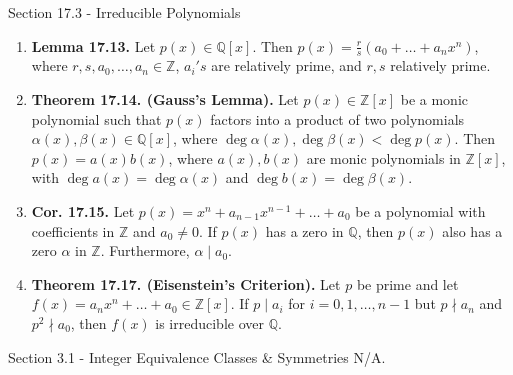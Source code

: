 \documentclass[12pt]{article}
\theoremstyle{definition}
\theoremstyle{named}
\begin{document}
\begin{section}{Section 17.3 - Irreducible Polynomials}
    \begin{enumerate}
        \item \textbf{Lemma 17.13. } Let $p(x) \in \mathbb{Q}[x]$. Then $p(x) = \frac{r}{s}(a_0 + \dots + a_nx^n)$, where $r,s,a_0,\dots,a_n \in \mathbb{Z}$, $a_i's$ are relatively prime, and $r,s$ relatively prime. 
        \item \textbf{Theorem 17.14. (Gauss's Lemma). } Let $p(x) \in \mathbb{Z}[x]$ be a monic polynomial such that $p(x)$ factors into a product of two polynomials $\alpha(x),\beta(x) \in \mathbb{Q}[x]$, where $\deg\alpha(x), \deg\beta(x) < \deg p(x)$. Then $p(x) = a(x)b(x)$, where $a(x),b(x)$ are monic polynomials in $\mathbb{Z}[x]$, with $\deg a(x) = \deg\alpha(x)$ and $\deg b(x) = \deg\beta(x)$.  
        \item \textbf{Cor. 17.15. } Let $p(x) = x^n + a_{n-1}x^{n-1} + \dots + a_0$ be a polynomial with coefficients in $\mathbb{Z}$ and $a_0 \neq 0$. If $p(x)$ has a zero in $\mathbb{Q}$, then $p(x)$ also has a zero $\alpha$ in $\mathbb{Z}$. Furthermore, $\alpha \mid a_0$. 
        \item \textbf{Theorem 17.17. (Eisenstein's Criterion). } Let $p$ be prime and let $f(x) = a_nx^n + \dots + a_0 \in \mathbb{Z}[x]$. If $p \mid a_i$ for $i=0,1,\dots,n-1$ but $p \nmid a_n$ and $p^2 \nmid a_0$, then $f(x)$ is irreducible over $\mathbb{Q}$. 
    \end{enumerate}
\end{section}

\begin{section}{Section 3.1 - Integer Equivalence Classes \& Symmetries}
    N/A. 
\end{section}
\end{document}
